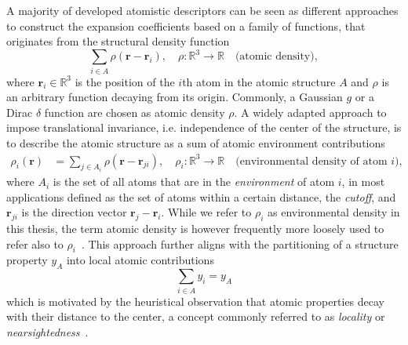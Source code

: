 A majority of developed atomistic descriptors can be seen as different approaches to construct the expansion coefficients based on a family of functions, that originates from the structural density function~\cite{musil2021physics} 
\begin{equation}
  \label{eq:basis_expansion}
  \sum_{i\in A} \rho(\mathbf{r}-\mathbf{r}_i),\quad \rho:\mathbb{R}^3\rightarrow\mathbb{R}\quad\text{(atomic density)},
\end{equation}
where $\mathbf{r}_i\in\mathbb{R}^3$ is the position of the $i$th atom in the atomic structure $A$ and $\rho$ is an arbitrary function decaying from its origin. 
Commonly, a Gaussian $g$ or a Dirac $\delta$ function are chosen as atomic density $\rho$.
A widely adapted approach to impose translational invariance, i.e. independence of the center of the structure, is to describe the atomic structure as a sum of atomic environment contributions
\begin{subequations}
\begin{align}
  \label{eq:density_atomic_contributions}
  \rho_i(\mathbf{r}) &= \sum_{j\in A_i} \rho(\mathbf{r}-\mathbf{r}_{ji}),\quad \rho_i:\mathbb{R}^3\rightarrow\mathbb{R}\quad\text{(environmental density of atom $i$)},
\end{align}
\end{subequations}
where $A_i$ is the set of all atoms that are in the \emph{environment} of atom
$i$, in most applications defined as the set of atoms within a certain distance, the
\emph{cutoff}, and $\mathbf{r}_{ji}$ is the direction vector $\mathbf{r}_j-\mathbf{r}_i$. 
While we refer to $\rho_i$ as environmental density in this thesis, the term atomic density is however frequently more loosely used to refer also to $\rho_i$~\cite{musil2021physics}.
This approach further aligns with the partitioning of a structure property $y_A$ into local atomic contributions
\begin{equation}
  \label{eq:structural_separation}
  \sum_{i\in A} y_i = y_A
\end{equation}
which is motivated by the heuristical observation that atomic properties decay with their distance to the center, a concept commonly referred to as \emph{locality} or \emph{nearsightedness}~\cite{prodan2005nearsightedness}.
